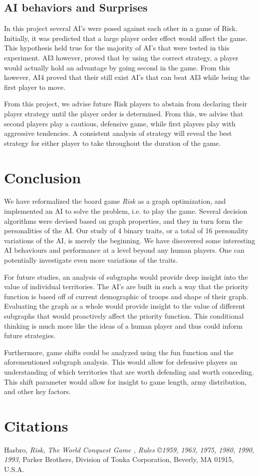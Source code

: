 \documentclass[12pt]{article}  %
\begin{document}
\subsection{AI behaviors and Surprises}
In this project several AI’s were posed against each other in a game of Risk. Initially, it was predicted that a large player order effect would affect the game. This hypothesis held true for the majority of AI’s that were tested in this experiment. AI3 however, proved that by using the correct strategy, a player would actually hold an advantage by going second in the game. From this however, AI4 proved that their still exist AI’s that can beat AI3 while being the first player to move. 

From this project, we advise future Risk players to abstain from declaring their player strategy until the player order is determined. From this, we advise that second players play a cautious, defensive game, while first players play with aggressive tendencies. A consistent analysis of strategy will reveal the best strategy for either player to take throughout the duration of the game. 



\section{Conclusion}
We have reformalized the board game \emph{Risk} as a graph optimization, and implemented an AI to solve the problem, i.e. to play the game. Several decision algorithms were devised based on graph properties, and they in turn form the personalities of the AI. Our study of 4 binary traits, or a total of 16 personality variations of the AI, is merely the beginning. We have discovered some interesting AI behaviours and performance at a level beyond any human players. One can potentially investigate even more variations of the traits.

For future studies, an analysis of subgraphs would provide deep insight into the value of individual territories. The AI’s are built in such a way that the priority function is based off of current demographic of troops and shape of their graph. Evaluating the graph as a whole would provide insight to the value of different subgraphs that would proactively affect the priority function. This conditional thinking is much more like the ideas of a human player and thus could inform future strategies. 

Furthermore, game shifts could be analyzed using the fun function and the aforementioned subgraph analysis. This would allow for defensive players an understanding of which territories that are worth defending and worth conceding. This shift parameter would allow for insight to game length, army distribution, and other key factors.  





\section{Citations}

Hasbro, \emph{Risk, The World Conquest Game \circledR, Rules ©1959, 1963, 1975, 1980, 1990, 1993}, Parker Brothers, Division of Tonka Corporation, Beverly, MA 01915, U.S.A.
\end{document}
